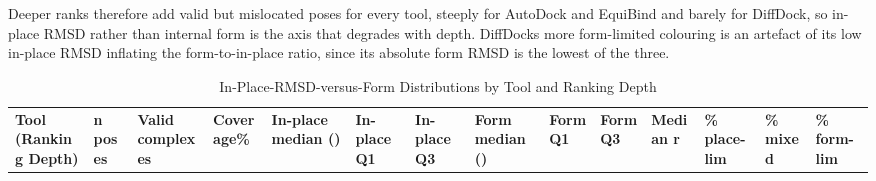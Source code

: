 Deeper ranks therefore add valid but mislocated poses for every tool, steeply for AutoDock and EquiBind and barely for DiffDock, so in-place RMSD rather than internal form is the axis that degrades with depth. DiffDock\textquotesingle s more form-limited colouring is an artefact of its low in-place RMSD inflating the form-to-in-place ratio, since its absolute form RMSD is the lowest of the three.

\begin{landscape}
\scriptsize
\setlength{\tabcolsep}{2pt}
\begin{longtable}[]{@{}
  >{\raggedright\arraybackslash}p{}
  >{\raggedleft\arraybackslash}p{}
  >{\raggedleft\arraybackslash}p{}
  >{\raggedleft\arraybackslash}p{}
  >{\raggedleft\arraybackslash}p{}
  >{\raggedleft\arraybackslash}p{}
  >{\raggedleft\arraybackslash}p{}
  >{\raggedleft\arraybackslash}p{}
  >{\raggedleft\arraybackslash}p{}
  >{\raggedleft\arraybackslash}p{}
  >{\raggedleft\arraybackslash}p{}
  >{\raggedleft\arraybackslash}p{}
  >{\raggedleft\arraybackslash}p{}
  >{\raggedleft\arraybackslash}p{}@{}}
\caption{In-Place-RMSD-versus-Form Distributions by Tool and Ranking Depth}\label{tab:results-placement-form}\tabularnewline
\toprule\noalign{}
\shortstack[l]{\textbf{Tool}\\\textbf{(Ranking Depth)}\strut} & \centering\arraybackslash\textbf{n poses} & \centering\arraybackslash\textbf{Valid complexes} & \centering\arraybackslash\textbf{Coverage\%} & \centering\arraybackslash\textbf{In-place median (\angstrom{})} & \centering\arraybackslash\textbf{In-place Q1} & \centering\arraybackslash\textbf{In-place Q3} & \centering\arraybackslash\textbf{Form median (\angstrom{})} & \centering\arraybackslash\textbf{Form Q1} & \centering\arraybackslash\textbf{Form Q3} & \centering\arraybackslash\textbf{Median r} & \centering\arraybackslash\textbf{\% place-lim} & \centering\arraybackslash\textbf{\% mixed} & \centering\arraybackslash\textbf{\% form-lim} \\

\end{longtable}
\end{landscape}
